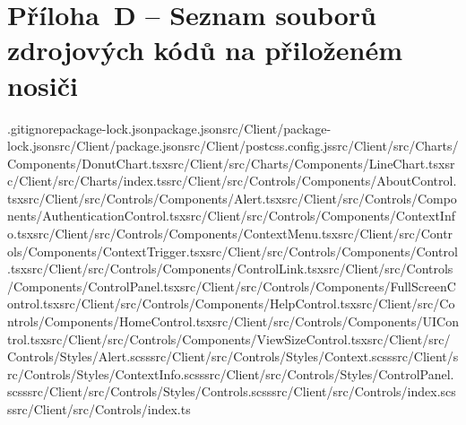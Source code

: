 \documentclass[a4paper,12pt]{article}
\begin{document}
\clearpage {}\label{prilohaD} 

\section*{Příloha~D --  Seznam souborů zdrojových kódů na přiloženém nosiči}

.gitignore\newline package-lock.json\newline package.json\newline src/Client/package-lock.json\newline src/Client/package.json\newline src/Client/postcss.config.js\newline src/Client/src/Charts/Components/DonutChart.tsx\newline src/Client/src/Charts/Components/LineChart.tsx\newline src/Client/src/Charts/index.ts\newline src/Client/src/Controls/Components/AboutControl.tsx\newline src/Client/src/Controls/Components/Alert.tsx\newline src/Client/src/Controls/Components/AuthenticationControl.tsx\newline src/Client/src/Controls/Components/ContextInfo.tsx\newline src/Client/src/Controls/Components/ContextMenu.tsx\newline src/Client/src/Controls/Components/ContextTrigger.tsx\newline src/Client/src/Controls/Components/Control.tsx\newline src/Client/src/Controls/Components/ControlLink.tsx\newline src/Client/src/Controls/Components/ControlPanel.tsx\newline src/Client/src/Controls/Components/FullScreenControl.tsx\newline src/Client/src/Controls/Components/HelpControl.tsx\newline src/Client/src/Controls/Components/HomeControl.tsx\newline src/Client/src/Controls/Components/UIControl.tsx\newline src/Client/src/Controls/Components/ViewSizeControl.tsx\newline src/Client/src/Controls/Styles/Alert.scss\newline src/Client/src/Controls/Styles/Context.scss\newline src/Client/src/Controls/Styles/ContextInfo.scss\newline src/Client/src/Controls/Styles/ControlPanel.scss\newline src/Client/src/Controls/Styles/Controls.scss\newline src/Client/src/Controls/index.scss\newline src/Client/src/Controls/index.ts\newline 
\end{document}
